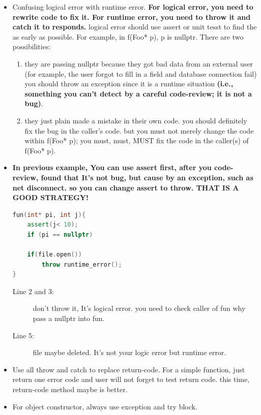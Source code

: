 \documentclass[a4paper,11pt,twoside]{book}
\begin{document}
\begin{itemize}
	\item Confusing logical error with runtime error. \textbf{For logical error, you need to rewrite code to fix it. For runtime error, you need to throw it and catch it to responds. } logical error should use assert  or unit tesst to find the as early as possible. For example, in f(Foo* p), p is nullptr. There are two possibilities:
	\begin{enumerate}
		\item they are passing nullptr because they got bad data from an external user (for example, the user forgot to fill in a field and database connection fail) you should throw an exception since it is a runtime situation \textbf{(i.e., something you can't detect by a careful code-review; it is not a bug)}.
		\item they just plain made a mistake in their own code. you should definitely fix the bug in the caller's code. but you must not merely change the code within f(Foo* p); you must, must, MUST fix the code in the caller(s) of f(Foo* p).
	\end{enumerate}
	\item \textbf{ In previous example, You can use assert first, after you code-review, found that It's not bug, but cause by an exception, such as net disconnect. so you can change assert to throw. THAT IS  A GOOD STRATEGY!}
	
\begin{lstlisting}[frame=single, language=c++]
fun(int* pi, int j){
	assert(j< 10);
	if (pi == nullptr)
	
	if(file.open())
		throw runtime_error();
}
\end{lstlisting}
\begin{description}
	\item[Line 2 and 3:] don't throw it, It's logical error. you need to check  caller of fun why pass a nullptr into fun.
	\item[Line 5:] file maybe deleted. It's not your logic error but runtime error.
\end{description}

	\item Use all throw and catch to replace return-code. For a simple function, just return one error code and user will not forget to test return code. this time, return-code method maybe is better.
	
	\item For object constructor, always use exception and try block.
	

\end{itemize}
\end{document}
